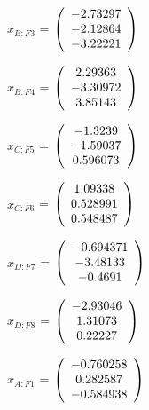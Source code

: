 \begin{description}
$x_{B:F3}$ = $\left( \begin{array} {ccc}   -2.73297 \\   -2.12864 \\   -3.22221 
\end{array} \right)\\ \\$

$x_{B:F4}$ = $\left( \begin{array} {ccc}    2.29363 \\   -3.30972 \\    3.85143 
\end{array} \right)\\ \\$

$x_{C:F5}$ = $\left( \begin{array} {ccc}    -1.3239 \\   -1.59037 \\   0.596073 
\end{array} \right)\\ \\$

$x_{C:F6}$ = $\left( \begin{array} {ccc}    1.09338 \\   0.528991 \\   0.548487 
\end{array} \right)\\ \\$

$x_{D:F7}$ = $\left( \begin{array} {ccc}  -0.694371 \\   -3.48133 \\    -0.4691 
\end{array} \right)\\ \\$

$x_{D:F8}$ = $\left( \begin{array} {ccc}   -2.93046 \\    1.31073 \\    0.22227 
\end{array} \right)\\ \\$

$\hat{x}_{A:F1}$ = $\left( \begin{array} {ccc}  -0.760258 \\   0.282587 \\  -0.584938 
\end{array} \right)\\ \\$


\end{description}
